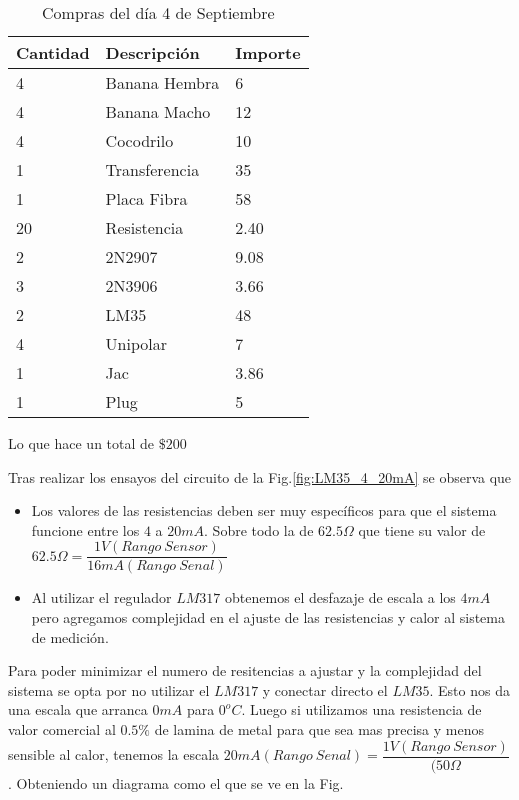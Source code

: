 \begin{table}[H]
  \begin{tabular}{l l l}
    \toprule
    \textbf{Cantidad} & \textbf{Descripción} & \textbf{Importe} \\
    \toprule
    4 	& 	Banana Hembra 	& 	6\\
    4  & 	Banana Macho	& 	12\\
    4	&	Cocodrilo	&	10\\
    1	&	Transferencia	&	35\\
    1	&	Placa Fibra	&	58\\
    20	&	Resistencia	&	2.40\\
    2	&	2N2907		&	9.08\\
    3	&	2N3906		&	3.66\\
    2	&	LM35		&	48\\
    4	&	Unipolar	&	7\\
    1	&	Jac		&	3.86\\
    1	&	Plug		&	5\\
    \bottomrule
  \end{tabular}
  \caption{Compras del día 4 de Septiembre}
  \label{tab:compra}
\end{table}
Lo que hace un total de $\$200$


Tras realizar los ensayos del circuito de la Fig.\ref{fig:LM35_4_20mA} se observa que 
\begin{itemize}
 \item Los valores de las resistencias deben ser muy específicos para que el sistema funcione
 entre los $4$ a $20mA$. Sobre todo la de $62.5\Omega$ que tiene su valor de 
 $62.5\Omega=\dfrac{1V(Rango~Sensor)}{16mA(Rango~Senal)}$
 \item Al utilizar el regulador $LM317$ obtenemos el desfazaje de escala a los $4mA$ pero 
 agregamos complejidad en el ajuste de las resistencias y calor al sistema de medición.
\end{itemize}

Para poder minimizar el numero de resitencias a ajustar y la complejidad del sistema se 
opta por no utilizar el $LM317$ y conectar directo el $LM35$. Esto nos da una escala que 
arranca $0mA$ para $0^oC$. Luego si utilizamos una resistencia de valor comercial al $0.5\%$
de lamina de metal para que sea mas precisa y menos sensible al calor, tenemos la escala 
$20mA(Rango~Senal)=\dfrac{1V(Rango~Sensor)}{(50\Omega}$. Obteniendo un diagrama como el que
se ve en la Fig.

